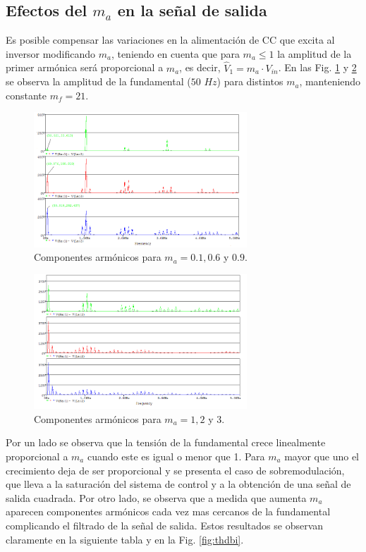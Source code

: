 \documentclass[conference]{IEEEtran}
\begin{document}
\subsection{Efectos del $m_a$ en la señal de salida}
Es posible compensar las variaciones en la alimentación de CC que excita al inversor modificando $m_a$, teniendo en cuenta que para $m_a \leq 1$ la amplitud de la primer armónica será proporcional a $m_a$, es decir, $\hat{V}_{1} = m_a \cdot V_{in}$.
En las Fig. \ref{fig:ma0bi} y \ref{fig:ma1bi} se observa la amplitud de la fundamental
($50$ $Hz$) para distintos $m_a$, manteniendo constante $m_f = 21$.
\begin{figure}[t]
	\centering
	\includegraphics[width=8cm]{imagenes/bipolar/ma0}
	\caption{Componentes armónicos para $m_a = 0.1, 0.6$ y $0.9$.}
	\label{fig:ma0bi}
\end{figure}
\begin{figure}[b]
	\centering
	\includegraphics[width=8cm]{imagenes/bipolar/ma1}
	\caption{Componentes armónicos para $m_a = 1, 2$ y $3$.}
	\label{fig:ma1bi}
\end{figure}
Por un lado se observa que la tensión de la fundamental crece linealmente proporcional a $m_a$ cuando este es igual o menor que 1. Para $m_a$ mayor que uno el crecimiento deja de ser proporcional y se presenta el caso de sobremodulación, que lleva a la saturación del sistema de control y a la obtención de una señal de salida cuadrada. Por otro lado, se observa que a medida que aumenta $m_a$ aparecen componentes armónicos cada vez mas cercanos de la fundamental complicando el filtrado de la señal de salida. Estos resultados se observan claramente en la siguiente tabla y en la Fig. \ref{fig:thdbi}.
\end{document}
